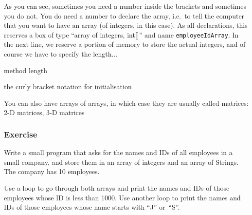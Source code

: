 As you can see, sometimes you need a number inside the brackets and
sometimes you do not. You do need a number to declare the array,
i.e.~to tell the computer that you want to have an array (of integers,
in this case). As all declarations, this reserves a box of type
``array of integers, int[]'' and name \verb+employeeIdArray+. In the
next line, we reserve a portion of memory to store the actual
integers, and of course we have to specify the length...

method length

the curly bracket notation for initialisation

You can also have arrays of arrays, in which case they are usually
called matrices: 2-D matrices, 3-D matrices

\subsubsection{Exercise}
\label{sec:exercisejfjfj}

Write a small program that asks for the names and IDs of all employees
in a small company, and store them in an array of integers and an
array of Strings. The company has 10 employees.

Use a loop to go through both arrays and print the names and IDs of
those employees whose ID is less than 1000. Use another loop to print
the names and IDs of those employees whose name starts with ``J''
or~``S''. 




